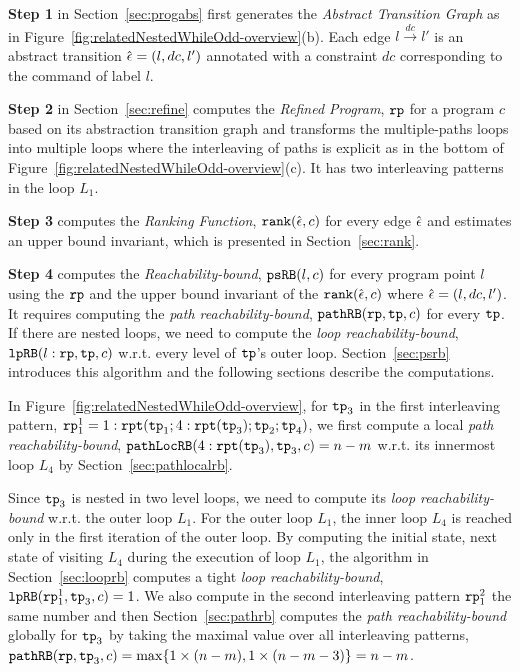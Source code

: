 
\textbf{Step 1}
in Section~\ref{sec:progabs} first 
generates the \emph{Abstract Transition Graph} as in Figure~\ref{fig:relatedNestedWhileOdd-overview}(b).
Each edge $l \xrightarrow{dc} l'$ is an abstract transition $\hat{\mathtt{\epsilon}{}} = (l, dc, l')$ annotated with a constraint $dc$ corresponding to the command of label $l$.

\textbf{Step 2} in Section~\ref{sec:refine}
computes the \emph{Refined Program}, $\mathtt{rp}$ for a program $c$ based on 
its abstraction transition graph and transforms the multiple-paths loops
into multiple loops where
the interleaving of paths is explicit as in the bottom of Figure~\ref{fig:relatedNestedWhileOdd-overview}(c).
It has two interleaving patterns in the loop $L_1$.

\textbf{Step 3} computes the \emph{Ranking Function}, $\mathtt{rank}(\hat{\mathtt{\epsilon}{}}, c)$
for every edge $\hat{\mathtt{\epsilon}{}}$ 
and estimates an upper bound invariant, which is presented in Section~\ref{sec:rank}.

\textbf{Step 4}
computes the \emph{Reachability-bound}, $\mathtt{psRB}(l, c)$ for every program point $l$ using the $\mathtt{rp}$ and the upper bound invariant of the $\mathtt{rank}(\hat{\mathtt{\epsilon}{}}, c)$ where $\hat{\mathtt{\epsilon}{}} = (l,dc,l')$.
{It requires computing the \emph{path reachability-bound}, $\mathtt{pathRB}(\mathtt{rp}, \mathtt{tp}, c)$ for every $\mathtt{tp}$.
If there are nested loops, we need to compute the \emph{loop reachability-bound}, $\mathtt{lpRB}(l: \mathtt{rp}, \mathtt{tp}, c)$ w.r.t. every level of $\mathtt{tp}$'s outer loop. }
Section~\ref{sec:psrb} introduces this algorithm and the following sections describe the computations. 

In Figure~\ref{fig:relatedNestedWhileOdd-overview}, for $\mathtt{tp}_3$ in the first interleaving pattern, $\mathtt{rp}_1^1 = 1: \mathtt{rpt}(\mathtt{tp}_1; 4:\mathtt{rpt}(\mathtt{tp}_3); \mathtt{tp}_2; \mathtt{tp}_4)$, 
we first compute a local \emph{path reachability-bound}, $\mathtt{pathLocRB}(4:\mathtt{rpt}(\mathtt{tp}_3), \mathtt{tp}_3, c) = n - m$
w.r.t. its innermost loop $L_4$ by Section~\ref{sec:pathlocalrb}.

Since $\mathtt{tp}_3$ is nested in two level loops, we need to compute its \emph{loop reachability-bound}
w.r.t. the outer loop $L_1$. 
For the outer loop $L_1$, the inner loop $L_4$ is reached only in the first iteration of the outer loop.
By computing the initial state, next state of visiting $L_4$
during the execution of loop $L_1$, the algorithm in Section~\ref{sec:looprb} computes a tight \emph{loop reachability-bound}, $\mathtt{lpRB}(\mathtt{rp}_1^1, \mathtt{tp}_3, c) = 1$. 
We also compute in the second interleaving pattern $\mathtt{rp}_1^2$ the same number and
then
Section~\ref{sec:pathrb} computes the  \emph{path reachability-bound} 
globally for $\mathtt{tp}_3$ by taking the maximal value over all interleaving patterns,
$\mathtt{pathRB}(\mathtt{rp}, \mathtt{tp}_3, c) = \max\{ 1 \times (n - m), 1 \times (n - m - 3) \} = n - m$.
%

